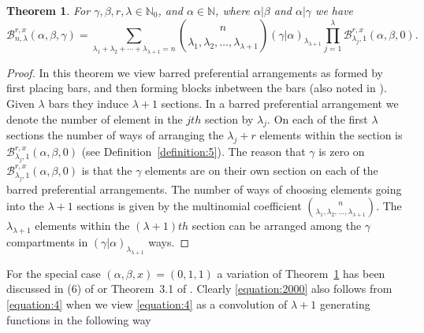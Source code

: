 \documentclass[12pt]{amsart}
\newtheorem{proof 1}{proof 1}
\newtheorem{theorem}{Theorem}[section]
\begin{document}
 

\begin{theorem}\label{theorem:3}For $\gamma,\beta,r,\lambda\in\mathbb{N}_0$, and $\alpha\in \mathbb{N}$, where ${\alpha}|\beta$ and ${\alpha}|\gamma$ we have
	\begin{equation}\label{equation:2000}
		\mathcal{B}^{r,x}_{n,\lambda}(\alpha,\beta,\gamma)=\sum_{\lambda_1+\lambda_2+\cdots+\lambda_{\lambda+1}=n}\binom{n}{\lambda_1,\lambda_2,\ldots,\lambda_{\lambda+1}}(\gamma|\alpha)_{\lambda_{\lambda+1}}\prod_{j=1}^{\lambda}	\mathcal{B}^{r,x}_{\lambda_{j},1}(\alpha,\beta,0).
	\end{equation}
\end{theorem}
\begin{proof} In this theorem we view barred preferential arrangements as formed by first placing bars, and then forming blocks inbetween the bars (also noted in \cite{pippenger2010hypercube}). Given $\lambda$ bars they induce $\lambda+1$ sections. In a barred preferential arrangement we denote the number of element in the $jth$ section by $\lambda_j$. On each of the first $\lambda$ sections the number of ways of arranging the $\lambda_j+r$ elements within the section is $\mathcal{B}^{r,x}_{\lambda_{j},1}(\alpha,\beta,0)$ (see Definition~\ref{definition:5}). The reason that $\gamma$ is zero on $\mathcal{B}^{r,x}_{\lambda_{j},1}(\alpha,\beta,0)$ is that the $\gamma$ elements are on their own section on each of the barred preferential arrangements.  The number of ways of choosing elements going into the $\lambda+1$ sections is given by the multinomial coefficient $\binom{n}{\lambda_1,\lambda_2,\ldots,\lambda_{\lambda+1}}$. The $\lambda_{\lambda+1}$ elements within the $(\lambda+1)th$ section can be arranged among the $\gamma$ compartments in $(\gamma|\alpha)_{\lambda_{\lambda+1}}$ ways.
\end{proof}

For the special case $(\alpha,\beta,x)=(0,1,1)$ a variation of Theorem~\ref{theorem:3} has been discussed in (6) of \cite{nkonkobe2017study} or Theorem~3.1 of \cite{nkonkobe2020combinatorial}. Clearly \eqref{equation:2000} also follows from \eqref{equation:4} when we view \eqref{equation:4} as a convolution of $\lambda+1$ generating functions in the following way
\end{document}
